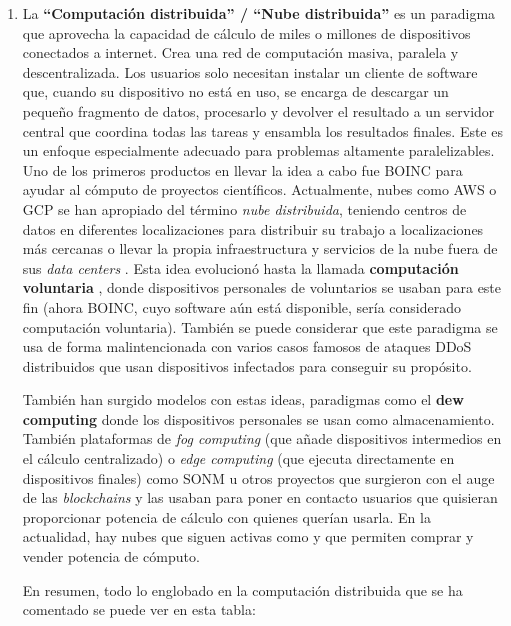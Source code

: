 \begin{enumerate}
	\item La \textbf{``Computación distribuida'' / ``Nube distribuida''} \label{def8} es un paradigma que aprovecha la capacidad de cálculo de miles o millones de dispositivos conectados a internet. Crea una red de computación masiva, paralela y descentralizada. Los usuarios solo necesitan instalar un cliente de software que, cuando su dispositivo no está en uso, se encarga de descargar un pequeño fragmento de datos, procesarlo y devolver el resultado a un servidor central que coordina todas las tareas y ensambla los resultados finales. Este es un enfoque especialmente adecuado para problemas altamente paralelizables. Uno de los primeros productos en llevar la idea a cabo fue BOINC \citep{Anderson2004BOINC} para ayudar al cómputo de proyectos científicos. Actualmente, nubes como AWS o GCP se han apropiado del término \textit{nube distribuida}, teniendo centros de datos en diferentes localizaciones para distribuir su trabajo a localizaciones más cercanas o llevar la propia infraestructura y servicios de la nube fuera de sus \textit{data centers} \citep{distributedGCP}.
	Esta idea evolucionó hasta la llamada \textbf{computación voluntaria} \citep{Anderson2010Volunteer}, donde dispositivos personales de voluntarios se usaban para este fin (ahora BOINC, cuyo software aún está disponible, sería considerado computación voluntaria). También se puede considerar que este paradigma se usa de forma malintencionada con varios casos famosos de ataques DDoS distribuidos \citep{MydoomDDoSMalware, 12Botnets} que usan dispositivos infectados para conseguir su propósito.

	También han surgido modelos con estas ideas, paradigmas como el \textbf{dew computing} \citep{DewComputing2018} donde los dispositivos personales se usan como almacenamiento. También plataformas de \textit{fog computing} (que añade dispositivos intermedios en el cálculo centralizado) o \textit{edge computing} (que ejecuta directamente en dispositivos finales) como SONM \citep{SONMWhitepaper} u otros proyectos \citep{BlockchainBasedDecentralisedCloud2018} que surgieron con el auge de las \textit{blockchains} y las usaban para poner en contacto usuarios que quisieran proporcionar potencia de cálculo con quienes querían usarla. En la actualidad, hay nubes que siguen activas como \citep{GolemNetwork, akashCloud, rendernetwork} y que permiten comprar y vender potencia de cómputo.

	En resumen, todo lo englobado en la computación distribuida que se ha comentado se puede ver en esta tabla:


\end{enumerate}
